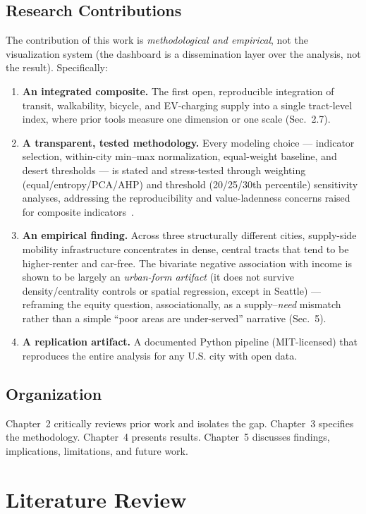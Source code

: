 \documentclass[11pt]{article}
\begin{document}
\subsection{Research Contributions}
The contribution of this work is \emph{methodological and empirical}, not the
visualization system (the dashboard is a dissemination layer over the analysis,
not the result). Specifically:
\begin{enumerate}[leftmargin=1.5em,itemsep=1pt]
\item \textbf{An integrated composite.} The first open, reproducible integration
of transit, walkability, bicycle, and EV-charging supply into a single
tract-level index, where prior tools measure one dimension or one scale (Sec.~2.7).
\item \textbf{A transparent, tested methodology.} Every modeling choice ---
indicator selection, within-city min--max normalization, equal-weight baseline,
and desert thresholds --- is stated and stress-tested through weighting
(equal/entropy/PCA/AHP) and threshold (20/25/30th percentile) sensitivity
analyses, addressing the reproducibility and value-ladenness concerns raised for
composite indicators~\cite{nardo2008}.
\item \textbf{An empirical finding.} Across three structurally different cities,
supply-side mobility infrastructure concentrates in dense, central tracts that
tend to be higher-renter and car-free. The bivariate negative association with
income is shown to be largely an \emph{urban-form artifact} (it does not survive
density/centrality controls or spatial regression, except in Seattle) ---
reframing the equity question, associationally, as a supply--\emph{need}
mismatch rather than a simple ``poor areas are under-served'' narrative (Sec.~5).
\item \textbf{A replication artifact.} A documented Python pipeline (MIT-licensed)
that reproduces the entire analysis for any U.S. city with open data.
\end{enumerate}

\subsection{Organization}
Chapter~2 critically reviews prior work and isolates the gap. Chapter~3 specifies
the methodology. Chapter~4 presents results. Chapter~5 discusses findings,
implications, limitations, and future work.

\section{Literature Review}
\end{document}
